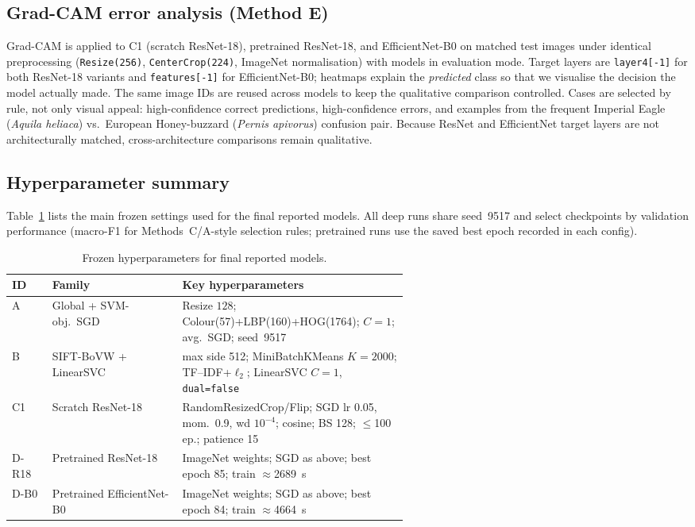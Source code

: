 \documentclass[10pt,twocolumn,letterpaper]{article}
\begin{document}
\subsection{Grad-CAM error analysis (Method E)}
\label{sec:method-e}

Grad-CAM \cite{selvaraju2017gradcam} is applied to C1 (scratch ResNet-18),
pretrained ResNet-18, and EfficientNet-B0 on matched test images under
identical preprocessing (\texttt{Resize(256)}, \texttt{CenterCrop(224)},
ImageNet normalisation) with models in evaluation mode. Target layers are
\texttt{layer4[-1]} for both ResNet-18 variants and \texttt{features[-1]} for
EfficientNet-B0; heatmaps explain the \emph{predicted} class so that we
visualise the decision the model actually made. The same image IDs are reused
across models to keep the qualitative comparison controlled. Cases are
selected by rule, not only visual appeal: high-confidence correct predictions,
high-confidence errors, and examples from the frequent Imperial Eagle
(\emph{Aquila heliaca}) vs.\ European Honey-buzzard (\emph{Pernis apivorus})
confusion pair. Because ResNet and EfficientNet target layers are not
architecturally matched, cross-architecture comparisons remain qualitative.

\subsection{Hyperparameter summary}

Table~\ref{tab:hparams} lists the main frozen settings used for the final
reported models. All deep runs share seed~9517 and select checkpoints by
validation performance (macro-F1 for Methods~C/A-style selection rules;
pretrained runs use the saved best epoch recorded in each config).

\begin{table}[t]
\centering
\footnotesize
\setlength{\tabcolsep}{3.5pt}
\begin{tabular}{@{}llp{0.58\linewidth}@{}}
\toprule
ID & Family & Key hyperparameters \\
\midrule
A & Global + SVM-obj.\ SGD
  & Resize $128$; Colour(57)+LBP(160)+HOG(1764); $C{=}1$; avg.\ SGD; seed~9517 \\
B & SIFT-BoVW + LinearSVC
  & max side 512; MiniBatchKMeans $K{=}2000$; TF--IDF+$\ell_2$; LinearSVC $C{=}1$, \texttt{dual=false} \\
C1 & Scratch ResNet-18
  & RandomResizedCrop/Flip; SGD lr 0.05, mom.\ 0.9, wd $10^{-4}$; cosine; BS 128; $\le$100 ep.; patience 15 \\
D-R18 & Pretrained ResNet-18
  & ImageNet weights; SGD as above; best epoch 85; train $\approx$2689~s \\
D-B0 & Pretrained EfficientNet-B0
  & ImageNet weights; SGD as above; best epoch 84; train $\approx$4664~s \\
\bottomrule
\end{tabular}
\caption{Frozen hyperparameters for final reported models.}
\label{tab:hparams}
\end{table}
\end{document}
